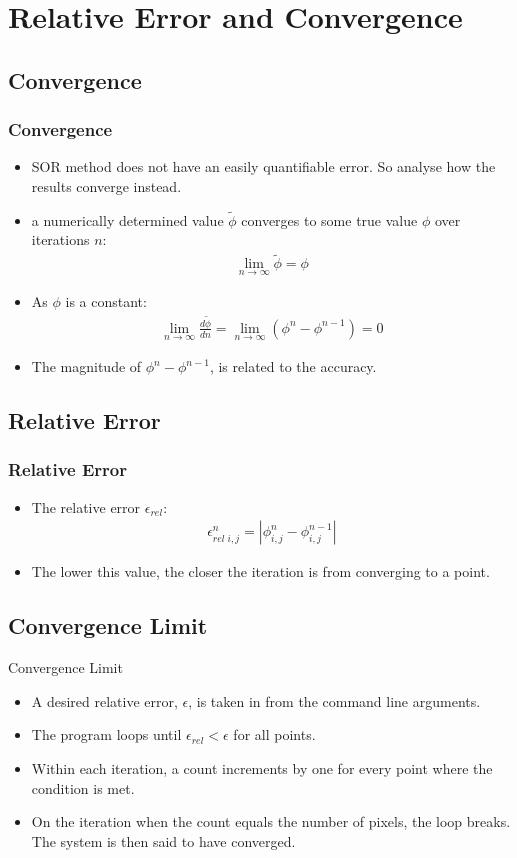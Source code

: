 \documentclass{beamer}
\begin{document}
\section{Relative Error and Convergence}
\subsection{Convergence}
\begin{frame}
\frametitle{Convergence}
\begin{itemize}
\item SOR method does not have an easily quantifiable error. So analyse how the results converge instead.
\item a numerically determined value $\tilde{\phi}$ converges to some true value $\phi$ over iterations $n$:
\begin{align*}
\lim_{n \to \infty} \tilde{\phi} = \phi
\end{align*}
\item As $\phi$ is a constant:
\begin{align*}
\lim_{n \to \infty} \frac{d \tilde{\phi}}{dn} = \lim_{n \to \infty} (\phi^{n} - \phi^{n-1}) = 0
\end{align*}
\item The magnitude of $\phi^{n} - \phi^{n-1}$, is related to the accuracy.
\end{itemize}
\end{frame}
\subsection{Relative Error}
\begin{frame}
\frametitle{Relative Error}
\begin{itemize}
\item  The relative error $\epsilon_{rel}$:
\begin{align*}
\epsilon_{rel \; i,j}^{n} = |\phi_{i,j}^{n} - \phi_{i,j}^{n-1}|
\end{align*}  
\item The lower this value, the closer the iteration is from converging to a point.
\end{itemize}
\end{frame}
\subsection{Convergence Limit}
\begin{frame}{Convergence Limit}
\begin{itemize}
\item A desired relative error, $\epsilon$, is taken in from the command line arguments.
\item The program loops until $\epsilon_{rel} < \epsilon$ for all points.
\item Within each iteration, a count increments by one for every point where the condition is met.
\item On the iteration when the count equals the number of pixels, the loop breaks. The system is then said to have converged.
\end{itemize}
\end{frame}
\end{document}
